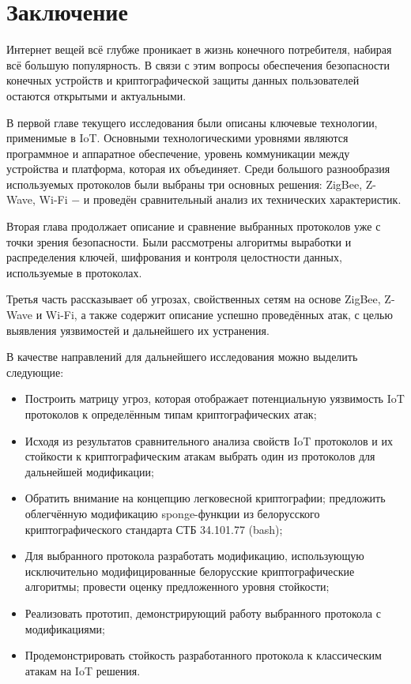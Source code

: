 \chapter*{Заключение}
	
	Интернет вещей всё глубже проникает в жизнь конечного потребителя, набирая всё большую популярность.
	В связи с этим вопросы обеспечения безопасности конечных устройств и криптографической защиты данных
	пользователей остаются открытыми и актуальными.
	
	В первой главе текущего исследования были описаны ключевые технологии, применимые в IoT. Основными
	технологическими уровнями являются программное и аппаратное обеспечение, уровень коммуникации
	между устройства и платформа, которая их объединяет. Среди большого разнообразия используемых
	протоколов были выбраны три основных решения: ZigBee, Z-Wave, Wi-Fi $-$ и проведён сравнительный анализ
	их технических характеристик.
	
	Вторая глава продолжает описание и сравнение выбранных протоколов уже с точки зрения безопасности.
	Были рассмотрены алгоритмы выработки и распределения ключей, шифрования и контроля целостности
	данных, используемые в протоколах.
	
	Третья часть рассказывает об угрозах, свойственных сетям на основе ZigBee, Z-Wave и Wi-Fi, а также
	содержит описание успешно проведённых атак, с целью выявления уязвимостей и дальнейшего их
	устранения.
	
	В качестве направлений для дальнейшего исследования можно выделить следующие:
	\begin{itemize}
		\item Построить матрицу угроз, которая отображает потенциальную уязвимость IoT протоколов 
		к определённым типам криптографических атак;
		\item Исходя из результатов сравнительного анализа свойств IoT протоколов и их стойкости 
		к криптографическим атакам выбрать один из протоколов для дальнейшей модификации;
		\item Обратить внимание на концепцию легковесной криптографии; предложить облегчённую 
		модификацию sponge-функции из белорусского 
		криптографического стандарта СТБ 34.101.77 (bash);
		\item Для выбранного протокола разработать модификацию, использующую исключительно 
		модифицированные белорусские криптографические алгоритмы; провести оценку предложенного 
		уровня стойкости;
		\item Реализовать прототип, демонстрирующий работу выбранного протокола с модификациями;
		\item Продемонстрировать стойкость разработанного протокола к классическим атакам на IoT решения.
	\end{itemize}
	